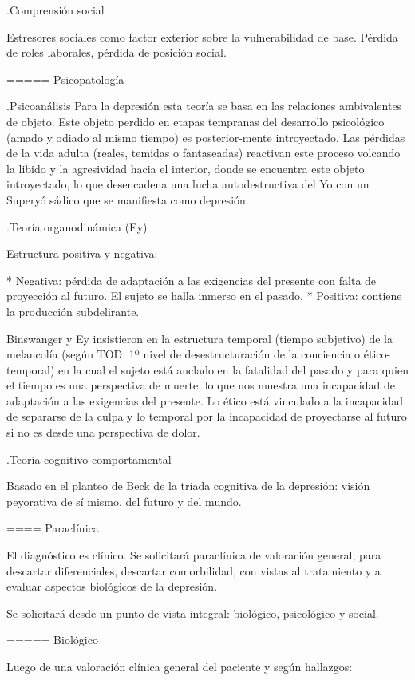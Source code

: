 .Comprensión social

Estresores sociales como factor exterior sobre la vulnerabilidad de base. Pérdida de roles laborales, pérdida de posición social.

===== Psicopatología

.Psicoanálisis
Para la depresión esta teoría se basa en las relaciones ambivalentes de objeto. Este objeto perdido en etapas tempranas del desarrollo psicológico (amado y odiado al mismo tiempo) es posterior-mente introyectado. Las pérdidas de la vida adulta (reales, temidas o fantaseadas) reactivan este proceso volcando la libido y la agresividad hacia el interior, donde se encuentra este objeto introyectado, lo que desencadena una lucha autodestructiva del Yo con un Superyó sádico que se manifiesta como depresión.

.Teoría organodinámica (Ey)

Estructura positiva y negativa:

* Negativa: pérdida de adaptación a las exigencias del presente con falta de proyección al futuro. El sujeto se halla inmerso en el pasado.
* Positiva: contiene la producción subdelirante.

Binswanger y Ey insistieron en la estructura temporal (tiempo subjetivo) de la melancolía (según TOD: 1º nivel de desestructuración de la conciencia o ético-temporal) en la cual el sujeto está anclado en la fatalidad del pasado y para quien el tiempo es una perspectiva de muerte, lo que nos muestra una incapacidad de adaptación a las exigencias del presente. Lo ético está vinculado a la incapacidad de separarse de la culpa y lo temporal por la incapacidad de proyectarse al futuro si no es desde una perspectiva de dolor.

.Teoría cognitivo-comportamental

Basado en el planteo de Beck de la tríada cognitiva de la depresión: visión peyorativa de sí mismo, del futuro y del mundo.

==== Paraclínica

El diagnóstico es clínico. Se solicitará paraclínica de valoración general, para descartar diferenciales, descartar comorbilidad, con vistas al tratamiento y a evaluar aspectos biológicos de la depresión.

Se solicitará desde un punto de vista integral: biológico, psicológico y social.

===== Biológico

Luego de una valoración clínica general del paciente y según hallazgos:

